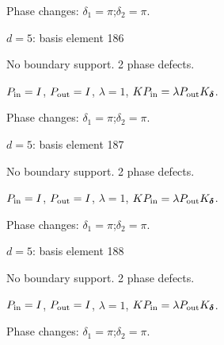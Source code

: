 \par\smallskip\begin{minipage}{.98\linewidth}\small Phase changes: $\delta_{1}=\pi$;\quad $\delta_{2}=\pi$.\end{minipage}
\vfill
{\footnotesize\texttt{}}
\newpage
{}
{\Large $d=5$: basis element 186}\par
No boundary support. 2 phase defects.
\begin{center}
\end{center}
\vspace{-1mm}
$P_{\rm in}=I$, \quad $P_{\rm out}=I$, \quad $\lambda=1$, \qquad $K P_{\rm in}=\lambda P_{\rm out}K_{\boldsymbol\delta}$.
\par\smallskip\begin{minipage}{.98\linewidth}\small Phase changes: $\delta_{1}=\pi$;\quad $\delta_{2}=\pi$.\end{minipage}
\vfill
{\footnotesize\texttt{}}
\newpage
{}
{\Large $d=5$: basis element 187}\par
No boundary support. 2 phase defects.
\begin{center}
\end{center}
\vspace{-1mm}
$P_{\rm in}=I$, \quad $P_{\rm out}=I$, \quad $\lambda=1$, \qquad $K P_{\rm in}=\lambda P_{\rm out}K_{\boldsymbol\delta}$.
\par\smallskip\begin{minipage}{.98\linewidth}\small Phase changes: $\delta_{1}=\pi$;\quad $\delta_{2}=\pi$.\end{minipage}
\vfill
{\footnotesize\texttt{}}
\newpage
{}
{\Large $d=5$: basis element 188}\par
No boundary support. 2 phase defects.
\begin{center}
\end{center}
\vspace{-1mm}
$P_{\rm in}=I$, \quad $P_{\rm out}=I$, \quad $\lambda=1$, \qquad $K P_{\rm in}=\lambda P_{\rm out}K_{\boldsymbol\delta}$.
\par\smallskip\begin{minipage}{.98\linewidth}\small Phase changes: $\delta_{1}=\pi$;\quad $\delta_{2}=\pi$.\end{minipage}
